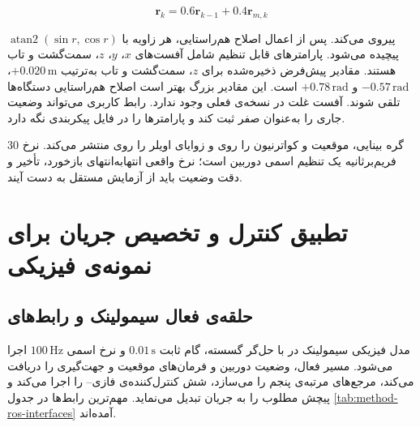 \begin{equation}
	\mathbf r_k=0.6\mathbf r_{k-1}+0.4\mathbf r_{m,k}
	\label{eq:method-orientation-filter}
\end{equation}

پیروی می‌کند. پس از اعمال اصلاح هم‌راستایی، هر زاویه با $\operatorname{atan2}(\sin r,\cos r)$ پیچیده می‌شود. پارامترهای قابل تنظیم شامل آفست‌های $x$، $y$، $z$، سمت‌گشت و تاب هستند. مقادیر پیش‌فرض ذخیره‌شده برای $z$، سمت‌گشت و تاب به‌ترتیب $+0.020\,\mathrm m$، $-0.57\,\mathrm{rad}$ و $+0.78\,\mathrm{rad}$ است. این مقادیر بزرگ بهتر است اصلاح هم‌راستایی دستگاه‌ها تلقی شوند. آفست غلت در نسخه‌ی فعلی وجود ندارد. رابط کاربری می‌تواند وضعیت جاری را به‌عنوان صفر ثبت کند و پارامترها را در فایل پیکربندی نگه دارد.

گره بینایی، موقعیت و کواترنیون را روی  و زوایای اویلر را روی  منتشر می‌کند. نرخ 30 فریم‌برثانیه یک تنظیم اسمی دوربین است؛ نرخ واقعی انتهابه‌انتهای بازخورد، تأخیر و دقت وضعیت باید از آزمایش مستقل به دست آیند.

\section{تطبیق کنترل و تخصیص جریان برای نمونه‌ی فیزیکی}
\label{sec:method-physical-control}

\subsection{حلقه‌ی فعال سیمولینک و رابط‌های }

مدل فیزیکی سیمولینک در  با حل‌گر گسسته، گام ثابت $0.01\,\mathrm s$ و نرخ اسمی $100\,\mathrm{Hz}$ اجرا می‌شود. مسیر فعال، وضعیت دوربین و فرمان‌های موقعیت و جهت‌گیری را دریافت می‌کند، مرجع‌های مرتبه‌ی پنجم را می‌سازد، شش کنترل‌کننده‌ی فازی-- را اجرا می‌کند و پیچش مطلوب را به جریان تبدیل می‌نماید. مهم‌ترین رابط‌ها در جدول \ref{tab:method-ros-interfaces} آمده‌اند.

